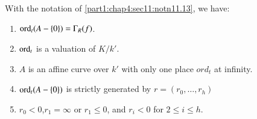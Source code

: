 \begin{lemma}\label{part1:chap4:sec11:lem11.14}
  With the notation of \ref{part1:chap4:sec11:notn11.13}, we have:
  \begin{enumerate}[\rm (i)]
    \item $\operatorname{ord}_t (A - \{ 0 \} )= \Gamma_R (f)$.
      \item $\operatorname{ord}_t$ is a valuation of $K/k'$.
        \item $A$ is an affine curve over $k'$ with only one place
          $ord_t$ at infinity.
          \item $\operatorname{ord}_t (A-\{ 0\})$ is strictly generated by $r= (r_0
            , \ldots , r_h)$
            \item $r_0 <0$,\pageoriginale $r_1 = \infty$ or $r_1 \leq 0$, and $r_i <
              0$ for $2 \leq i \leq h$.
  \end{enumerate}
\end{lemma}

